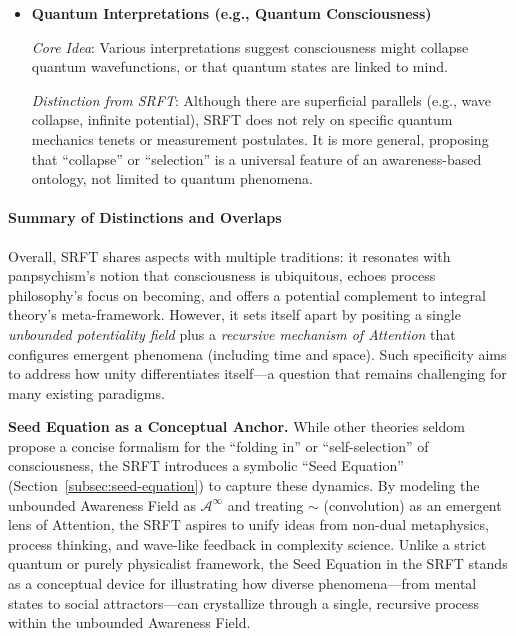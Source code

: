 \documentclass[12pt,a4paper]{article}
\begin{document}
\begin{itemize}
    \item \textbf{Quantum Interpretations (e.g., Quantum Consciousness)}  
    
    \textit{Core Idea}: Various interpretations suggest consciousness might collapse quantum wavefunctions, or that quantum states are linked to mind.  
    
    \textit{Distinction from SRFT}: Although there are superficial parallels (e.g., wave collapse, infinite potential), SRFT does not rely on specific quantum mechanics tenets or measurement postulates. It is more general, proposing that “collapse” or “selection” is a universal feature of an awareness-based ontology, not limited to quantum phenomena.
\end{itemize}

\paragraph{Summary of Distinctions and Overlaps}
Overall, SRFT shares aspects with multiple traditions: it resonates with panpsychism’s notion that consciousness is ubiquitous, echoes process philosophy’s focus on becoming, and offers a potential complement to integral theory’s meta-framework. However, it sets itself apart by positing a single \emph{unbounded potentiality field} plus a \emph{recursive mechanism of Attention} that configures emergent phenomena (including time and space). Such specificity aims to address how unity differentiates itself---a question that remains challenging for many existing paradigms.

\medskip

\noindent
\textbf{Seed Equation as a Conceptual Anchor.}  
While other theories seldom propose a concise formalism for the “folding in” or “self-selection” of consciousness, the SRFT introduces a symbolic “Seed Equation” (Section~\ref{subsec:seed-equation}) to capture these dynamics. By modeling the unbounded Awareness Field as \(\mathscr{A}^\infty\) and treating \(\sim\) (convolution) as an emergent lens of Attention, the SRFT aspires to unify ideas from non-dual metaphysics, process thinking, and wave-like feedback in complexity science. Unlike a strict quantum or purely physicalist framework, the Seed Equation in the SRFT stands as a conceptual device for illustrating how diverse phenomena---from mental states to social attractors---can crystallize through a single, recursive process within the unbounded Awareness Field.

\medskip
\end{document}
